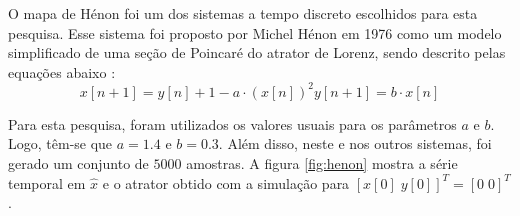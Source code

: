 \documentclass{article}
\begin{document}
O mapa de Hénon foi um dos sistemas a tempo discreto escolhidos para esta pesquisa. Esse sistema foi proposto por Michel Hénon em 1976 como um modelo simplificado de uma seção de Poincaré do atrator de Lorenz, sendo descrito pelas equações abaixo \cite{henon1976two}:
\begin{subequations}
\begin{equation}
x[n+1] = y[n] + 1 - a\cdot (x[n])^2
\end{equation}
\begin{equation}
y[n+1] = b \cdot x[n]
\end{equation}
\end{subequations}

Para esta pesquisa, foram utilizados os valores usuais para os parâmetros $a$ e $b$. Logo, têm-se que $a = 1.4$ e $b = 0.3$. Além disso, neste e nos outros sistemas, foi gerado um conjunto de $5000$ amostras. A figura \ref{fig:henon} mostra a série temporal em $\hat{x}$ e o atrator obtido com a simulação para $[x[0]\; y[0]]^T = [0\; 0]^T$.
\end{document}

